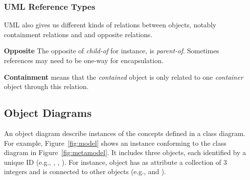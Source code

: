 
\subsubsection{UML Reference Types}
UML also gives us different kinds of relations between objects, notably containment relations and and opposite relations.

\noindent \textbf{Opposite} 
The opposite of \textit{child-of} for instance, is \textit{parent-of}.
Sometimes references may need to be one-way for encapsulation.

\noindent \textbf{Containment} means that the \textit{contained} object is only related to one \textit{container} object through this relation.



\subsection{Object Diagrams}
An object diagram describe instances of the concepts defined in a class diagram.
For example, Figure~\ref{fig:model} shows an instance conforming to the class diagram in Figure~\ref{fig:metamodel}. It includes three objects, each identified by a unique ID (e.g., , , ). For instance, object  has as attribute a collection of 3 integers and is connected to other objects (e.g.,  and ).

